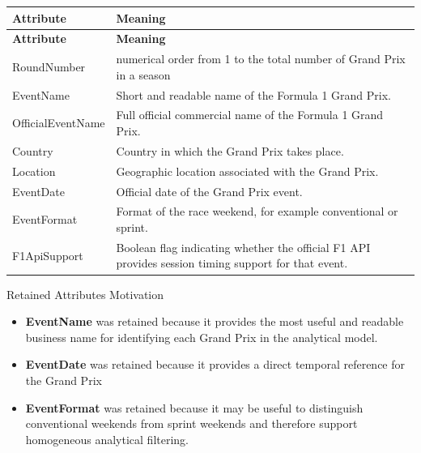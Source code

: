 \documentclass[a4paper,11pt]{article}
\begin{document}
	\begin{longtable}{|p{4cm}|p{10.8cm}|}
		\hline
		\textbf{Attribute} & \textbf{Meaning} \\
		\hline
		\endfirsthead
		
		\hline
		\textbf{Attribute} & \textbf{Meaning} \\
		\hline
		\endhead
		RoundNumber & numerical order from 1 to the total number of Grand Prix in a season \\ \hline
		
		EventName & Short and readable name of the Formula 1 Grand Prix. \\ \hline
		
		OfficialEventName & Full official commercial name of the Formula 1 Grand Prix. \\ \hline
		
		Country & Country in which the Grand Prix takes place. \\ \hline
		
		Location & Geographic location associated with the Grand Prix. \\ \hline
		
		EventDate & Official date of the Grand Prix event. \\ \hline
		
		EventFormat & Format of the race weekend, for example conventional or sprint. \\ \hline
		
		F1ApiSupport & Boolean flag indicating whether the official F1 API provides session timing support for that event. \\ \hline
		
	\end{longtable}
	
	
	Retained Attributes Motivation
	
	\begin{itemize}
		\item \textbf{EventName} was retained because it provides the most useful and readable business name for identifying each Grand Prix in the analytical model.
		
		\item \textbf{EventDate} was retained because it provides a direct temporal reference for the Grand Prix 
		
		\item \textbf{EventFormat} was retained because it may be useful to distinguish conventional weekends from sprint weekends and therefore support homogeneous analytical filtering.
	\end{itemize}
	
\end{document}
